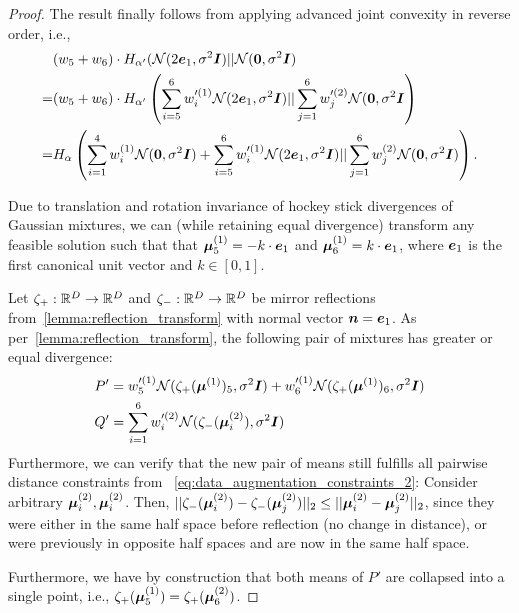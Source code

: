 \begin{proof}
    The result finally follows from applying advanced joint convexity in reverse order, i.e.,
    \begin{align*}
    &
    (w_5 + w_6)
    \cdot 
    H_{\alpha'}(\mathcal{N}(2 {\bm{e}}_1, \sigma^2 {\bm{I}}) || \mathcal{N}({\bm{0}}, \sigma^2 {\bm{I}})
    \\
    =
    &
    (w_5 + w_6)
    \cdot 
    H_{\alpha'}\left( \sum_{i=5}^6 w'^{(1)}_i \mathcal{N}( 2 {\bm{e}}_1, \sigma^2 {\bm{I}}) || \sum_{j=1}^6 w'^{(2)}_j \mathcal{N}({\bm{0}}, \sigma^2 {\bm{I}}\right)
    \\
    =
    &
    H_{\alpha}\left( \sum_{i=1}^4 w^{(1)}_i \mathcal{N}({\bm{0}}, \sigma^2 {\bm{I}}) +  \sum_{i=5}^6 w'^{(1)}_i \mathcal{N}( 2 {\bm{e}}_1, \sigma^2 {\bm{I}}) || \sum_{j=1}^6 w^{(2)}_j \mathcal{N}({\bm{0}}, \sigma^2 {\bm{I}}) \right).
    \end{align*}
    

    \iffalse
    Due to translation and rotation invariance of hockey stick divergences of Gaussian mixtures,
    we can (while retaining equal divergence) transform any feasible solution such that 
    that ${\bm{\mu}}^{(1)}_5 = - k \cdot {\bm{e}}_1$ and $ {\bm{\mu}}^{(1)}_6 = k \cdot {\bm{e}}_1$,
    where ${\bm{e}}_1$ is the first canonical unit vector and $k \in [0,1]$.

    Let $\zeta_+ : {\mathbb{R}}^D \rightarrow {\mathbb{R}}^D$ and $\zeta_- : {\mathbb{R}}^D \rightarrow {\mathbb{R}}^D$
    be mirror reflections from~\cref{lemma:reflection_transform} with normal vector ${\bm{n}} = {\bm{e}}_1$.
    As per~\cref{lemma:reflection_transform}, the following pair of mixtures has greater or equal divergence: 
    \begin{align*}
       & P' = w'^{(1)}_5 \mathcal{N}(\zeta_+({\bm{\mu}}^{(1)})_5, \sigma^2 {\bm{I}})  +  w'^{(1)}_6 \mathcal{N}(\zeta_+({\bm{\mu}}^{(1)})_6, \sigma^2 {\bm{I}})\\
       & Q' = \sum_{i=1}^6 w'^{(2)}_i \mathcal{N}(\zeta_-({\bm{\mu}}^{(2)}_i), \sigma^2 {\bm{I}})
    \end{align*}
    Furthermore, we can verify that the new pair of means still fulfills all pairwise distance constraints from
    ~\cref{eq:data_augmentation_constraints_2}:
    Consider arbitrary ${\bm{\mu}}^{(2)}_i, {\bm{\mu}}^{(2)}_i$.
    Then, $||\zeta_-({\bm{\mu}}^{(2)}_i) - \zeta_-({\bm{\mu}}^{(2)}_j)||_2 \leq ||{\bm{\mu}}^{(2)}_i - {\bm{\mu}}^{(2)}_j||_2$, 
    since they were either in the same half space before reflection (no change in distance),
    or were previously in opposite half spaces and are now in the same half space.

    Furthermore, we have by construction that both means of $P'$ are collapsed into a single point, i.e., 
    $\zeta_+({\bm{\mu}}^{(1)}_5) = \zeta_+({\bm{\mu}}^{(2)}_6)$.


\end{proof}
